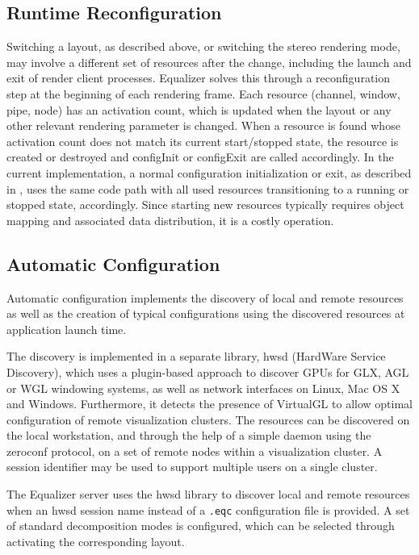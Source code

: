 \documentclass[10pt,journal,compsoc]{IEEEtran}
\begin{document}
\subsection{Runtime Reconfiguration}\label{sec:reconfig}

Switching a layout, as described above, or switching the stereo rendering mode,
may involve a different set of resources after the change, including the launch
and exit of render client processes. \textsf{Equalizer} solves this through a
reconfiguration step at the beginning of each rendering frame. Each resource
(channel, window, pipe, node) has an activation count, which is updated when the
layout or any other relevant rendering parameter is changed. When a resource is
found whose activation count does not match its current start/stopped state, the
resource is created or destroyed and \textsf{configInit} or \textsf{configExit}
are called accordingly. In the current implementation, a normal configuration
initialization or exit, as described in \cite{EMP:09}, uses the same code path
with all used resources transitioning to a running or stopped state,
accordingly. Since starting new resources typically requires object mapping and
associated data distribution, it is a costly operation.

\subsection{Automatic Configuration}

Automatic configuration implements the discovery of local and remote resources
as well as the creation of typical configurations using the discovered resources
at application launch time.

The discovery is implemented in a separate library, \textsf{hwsd} (HardWare
Service
Discovery), which uses a plugin-based approach to discover GPUs for GLX, AGL or
WGL windowing systems, as well as network interfaces on Linux, Mac OS X and
Windows. Furthermore, it detects the presence of VirtualGL to allow optimal
configuration of remote visualization clusters. The resources can be discovered
on the local workstation, and through the help of a simple daemon using the
zeroconf protocol, on a set of remote nodes within a visualization cluster. A
session identifier may be used to support multiple users on a single cluster.

The \textsf{Equalizer} server uses the hwsd library to discover local and remote
resources when an hwsd session name instead of a \texttt{.eqc} configuration
file is provided. A set of standard decomposition modes is configured, which can
be selected through activating the corresponding layout.
\end{document}
